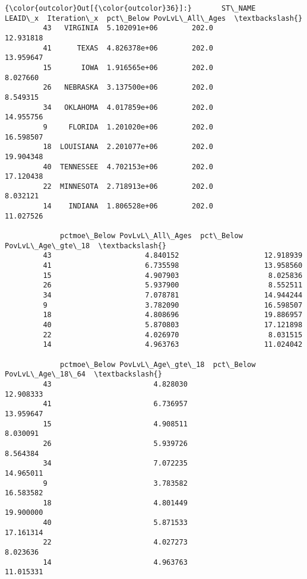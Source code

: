 \documentclass[11pt]{article}
\begin{document}
\begin{Verbatim}[commandchars=\\\{\}]
{\color{outcolor}Out[{\color{outcolor}36}]:}       ST\_NAME       LEAID\_x  Iteration\_x  pct\_Below PovLvL\_All\_Ages  \textbackslash{}
         43   VIRGINIA  5.102091e+06        202.0                  12.931818   
         41      TEXAS  4.826378e+06        202.0                  13.959647   
         15       IOWA  1.916565e+06        202.0                   8.027660   
         26   NEBRASKA  3.137500e+06        202.0                   8.549315   
         34   OKLAHOMA  4.017859e+06        202.0                  14.955756   
         9     FLORIDA  1.201020e+06        202.0                  16.598507   
         18  LOUISIANA  2.201077e+06        202.0                  19.904348   
         40  TENNESSEE  4.702153e+06        202.0                  17.120438   
         22  MINNESOTA  2.718913e+06        202.0                   8.032121   
         14    INDIANA  1.806528e+06        202.0                  11.027526   
         
             pctmoe\_Below PovLvL\_All\_Ages  pct\_Below PovLvL\_Age\_gte\_18  \textbackslash{}
         43                      4.840152                    12.918939   
         41                      6.735598                    13.958560   
         15                      4.907903                     8.025836   
         26                      5.937900                     8.552511   
         34                      7.078781                    14.944244   
         9                       3.782090                    16.598507   
         18                      4.808696                    19.886957   
         40                      5.870803                    17.121898   
         22                      4.026970                     8.031515   
         14                      4.963763                    11.024042   
         
             pctmoe\_Below PovLvL\_Age\_gte\_18  pct\_Below PovLvL\_Age\_18\_64  \textbackslash{}
         43                        4.828030                   12.908333   
         41                        6.736957                   13.959647   
         15                        4.908511                    8.030091   
         26                        5.939726                    8.564384   
         34                        7.072235                   14.965011   
         9                         3.783582                   16.583582   
         18                        4.801449                   19.900000   
         40                        5.871533                   17.161314   
         22                        4.027273                    8.023636   
         14                        4.963763                   11.015331   
         

\end{Verbatim}
\end{document}
